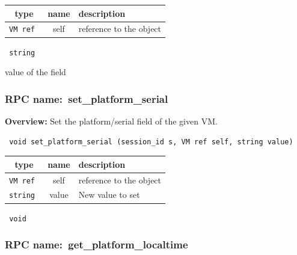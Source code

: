 
 
\vspace{0.3cm}
\begin{tabular}{|c|c|p{7cm}|}
 \hline
{\bf type} & {\bf name} & {\bf description} \\ \hline
{\tt VM ref } & self & reference to the object \\ \hline 

\end{tabular}

\vspace{0.3cm}

{\tt 
string
}


value of the field
\vspace{0.3cm}
\vspace{0.3cm}
\vspace{0.3cm}
\subsubsection{RPC name:~set\_platform\_serial}

{\bf Overview:} 
Set the platform/serial field of the given VM.

\begin{verbatim} void set_platform_serial (session_id s, VM ref self, string value)\end{verbatim}



 
\vspace{0.3cm}
\begin{tabular}{|c|c|p{7cm}|}
 \hline
{\bf type} & {\bf name} & {\bf description} \\ \hline
{\tt VM ref } & self & reference to the object \\ \hline 

{\tt string } & value & New value to set \\ \hline 

\end{tabular}

\vspace{0.3cm}

{\tt 
void
}



\vspace{0.3cm}
\vspace{0.3cm}
\vspace{0.3cm}
\subsubsection{RPC name:~get\_platform\_localtime}

